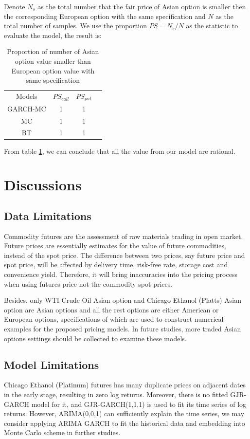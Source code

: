 \documentclass[10pt, a4paper, twocolumn]{article} %
\begin{document}
Denote $ N_s $ as the total number that the fair price of Asian option is smaller then the corresponding European option with the same specification and $ N $ as the total number of samples. We use the proportion $ PS = N_s / N $ as the statistic to evaluate the model, the result is:
\begin{table}[!ht]
\small
\centering
\begin{tabular}{cccc}
Models & $ PS_{call} $ & $ PS_{put} $ \\
GARCH-MC & 1 & 1 \\
MC & 1 & 1 \\
BT & 1 & 1 \\
\end{tabular}
\caption{Proportion of number of Asian option value smaller than European option value with same specification}
\label{PS}
\end{table}

From table \ref{PS}, we can conclude that all the value from our model are rational.


\section{Discussions}

\subsection{Data Limitations}
Commodity futures are the assessment of raw materials trading in open market. Future prices are essentially estimates for the value of future commodities, instead of the spot price. The difference between two prices, say future price and spot price, will be affected by delivery time, risk-free rate, storage cost and convenience yield. Therefore, it will bring inaccuracies into the pricing process when using futures price not the commodity spot prices.

Besides, only WTI Crude Oil Asian option and Chicago Ethanol (Platts) Asian option are Asian options and all the rest options are either American or European options, specifications of which are used to construct numerical examples for the proposed pricing models. In future studies, more traded Asian options settings should be collected to examine these models.

\subsection{Model Limitations}
Chicago Ethanol (Platinum) futures has many duplicate prices on adjacent dates in the early stage, resulting in zero log returns. Moreover, there is no fitted GJR-GARCH model for it, and GJR-GARCH(1,1,1) is used to fit its time series of log returns. However, ARIMA(0,0,1) can sufficiently explain the time series, we may consider applying ARIMA GARCH to fit the historical data and embedding into Monte Carlo scheme in further studies.
\end{document}
